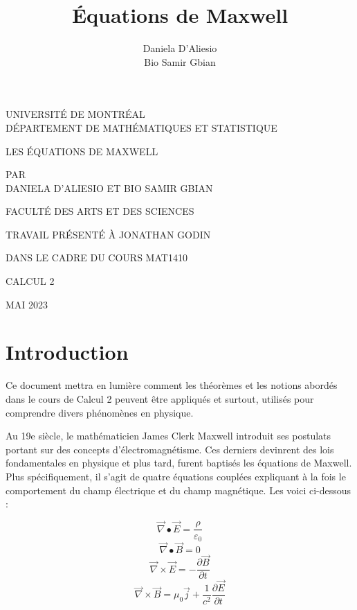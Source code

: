 \documentclass[12pt]{article}
\title{\textbf{Équations de Maxwell}}
\author{Daniela D'Aliesio \\Bio Samir Gbian}
\begin{document}
\begin{titlepage}
   \centering
    \vfill
    {\large UNIVERSITÉ DE MONTRÉAL\\DÉPARTEMENT DE MATHÉMATIQUES ET STATISTIQUE\par}
    \vspace{4cm}
    {\large LES ÉQUATIONS DE MAXWELL\par}
    \vspace{3cm}
    {\large PAR\\DANIELA D'ALIESIO ET BIO SAMIR GBIAN\par}
    \vspace{3cm}
    {\large FACULTÉ DES ARTS ET DES SCIENCES\par}
    \vspace{3cm}
    {\large TRAVAIL PRÉSENTÉ À JONATHAN GODIN\par}
    {\large DANS LE CADRE DU COURS MAT1410\par}
    {\large CALCUL 2\par}
    \vspace{2cm}
    {\large MAI 2023 \par}
\end{titlepage}

\section*{Introduction}
\justifying
\noindent Ce document mettra en lumière comment les théorèmes et les notions abordés dans le cours de Calcul 2 peuvent être appliqués et surtout, utilisés pour comprendre divers phénomènes en physique.

\noindent Au 19e siècle, le mathématicien James Clerk Maxwell introduit ses postulats portant sur des concepts d'électromagnétisme. Ces derniers devinrent des lois fondamentales en physique et plus tard, furent baptisés les équations de Maxwell. Plus spécifiquement, il s'agit de quatre équations couplées expliquant à la fois le comportement du champ électrique et du champ magnétique. Les voici ci-dessous : 

\begin {equation} \vec{\nabla} \bullet \vec{E} = \frac{\rho}{\varepsilon_0} \end{equation}
\begin{equation}\vec{\nabla} \bullet \vec{B} = 0\end{equation}
\begin{equation}\vec{\nabla} \times \vec{E} = - \frac{\partial \vec{B}}{\partial t} \end{equation}
\begin{equation}\vec{\nabla} \times \vec{B} = \mu_0\vec{j}+ \frac{1}{c^2}\frac{\partial \vec{E}}{\partial t}\end{equation}
\end{document}
